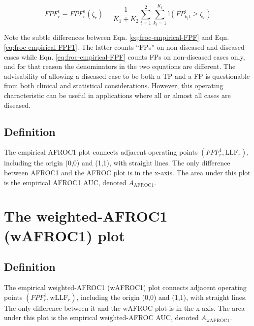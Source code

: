 \documentclass[
]{book}
\begin{document}
\begin{equation}
FPF_r^1 \equiv FPF_r^1\left ( \zeta_r \right ) = \frac{1}{K_1+K_2}\sum_{t=1}^{2}\sum_{k_t=1}^{K_t} \mathbb{I}\left ( FP_{k_t t}^1 \geq \zeta_r \right )
\label{eq:froc-empirical-FPF1}
\end{equation}

Note the subtle differences between Eqn. \eqref{eq:froc-empirical-FPF} and Eqn. \eqref{eq:froc-empirical-FPF1}. The latter counts ``FPs'' on non-diseased and diseased cases while Eqn. \eqref{eq:froc-empirical-FPF} counts FPs on non-diseased cases only, and for that reason the denominators in the two equations are different. The advisability of allowing a diseased case to be both a TP and a FP is questionable from both clinical and statistical considerations. However, this operating characteristic can be useful in applications where all or almost all cases are diseased.

\hypertarget{froc-empirical-definition-auc-AFROC1}{%
\subsection{Definition}\label{froc-empirical-definition-auc-AFROC1}}

The empirical AFROC1 plot connects adjacent operating points \(\left ( FPF_r^1, \text{LLF}_r \right )\), including the origin (0,0) and (1,1), with straight lines. The only difference between AFROC1 and the AFROC plot is in the x-axis. The area under this plot is the empirical AFROC1 AUC, denoted \(A_{\text{AFROC1}}\).

\hypertarget{froc-empirical-wAFROC1}{%
\section{The weighted-AFROC1 (wAFROC1) plot}\label{froc-empirical-wAFROC1}}

\hypertarget{froc-empirical-definition-auc-wAFROC1}{%
\subsection{Definition}\label{froc-empirical-definition-auc-wAFROC1}}

The empirical weighted-AFROC1 (wAFROC1) plot connects adjacent operating points \(\left ( FPF_r^1, \text{wLLF}_r \right )\), including the origin (0,0) and (1,1), with straight lines. The only difference between it and the wAFROC plot is in the x-axis. The area under this plot is the empirical weighted-AFROC AUC, denoted \(A_{\text{wAFROC1}}\).
\end{document}

